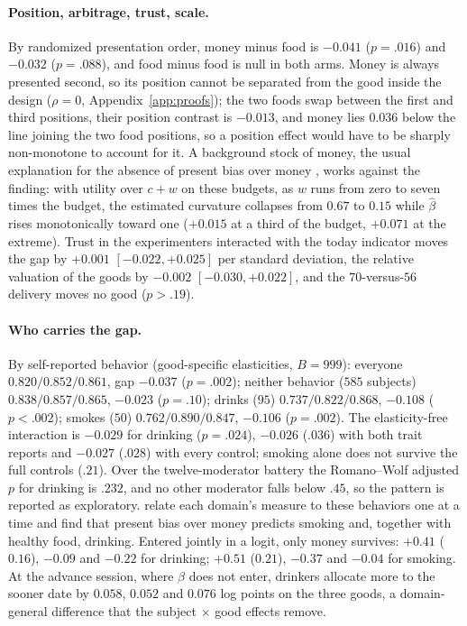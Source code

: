 \documentclass[11pt,a4paper]{article}
\theoremstyle{plain}
\theoremstyle{definition}
\begin{document}
\paragraph{Position, arbitrage, trust, scale.} By randomized presentation order, money minus food is $-0.041$
($p=.016$) and $-0.032$ ($p=.088$), and food minus food is null in both arms. Money is always presented second, so its
position cannot be separated from the good inside the design ($\rho=0$, Appendix~\ref{app:proofs}); the two foods swap
between the first and third positions, their position contrast is $-0.013$, and money lies $0.036$ below the line
joining the two food positions, so a position effect would have to be sharply non-monotone to account for it. A
background stock of money, the usual explanation for the absence of present bias over money \citep{cohen2020}, works
against the finding: with utility over $c+w$ on these budgets, as $w$ runs from zero to seven times the budget, the
estimated curvature collapses from $0.67$ to $0.15$ while $\hat\beta$ rises monotonically toward one ($+0.015$ at a
third of the budget, $+0.071$ at the extreme). Trust in the experimenters interacted with the today indicator moves
the gap by $+0.001$ $[-0.022,+0.025]$ per standard deviation, the relative valuation of the goods by $-0.002$
$[-0.030,+0.022]$, and the $70$-versus-$56$ delivery moves no good ($p>.19$).

\paragraph{Who carries the gap.} By self-reported behavior (good-specific elasticities, $B=999$): everyone
$0.820/0.852/0.861$, gap $-0.037$ ($p=.002$); neither behavior ($585$ subjects) $0.838/0.857/0.865$, $-0.023$
($p=.10$); drinks ($95$) $0.737/0.822/0.868$, $-0.108$ ($p<.002$); smokes ($50$) $0.762/0.890/0.847$, $-0.106$
($p=.002$). The elasticity-free interaction is $-0.029$ for drinking ($p=.024$), $-0.026$ ($.036$) with both trait
reports and $-0.027$ ($.028$) with every control; smoking alone does not survive the full controls ($.21$). Over the
twelve-moderator battery the Romano--Wolf adjusted $p$ for drinking is $.232$, and no other moderator falls below
$.45$, so the pattern is reported as exploratory. \citet{cheung2022} relate each domain's measure to these behaviors
one at a time and find that present bias over money predicts smoking and, together with healthy food, drinking.
Entered jointly in a logit, only money survives: $+0.41$ ($0.16$), $-0.09$ and $-0.22$ for drinking; $+0.51$
($0.21$), $-0.37$ and $-0.04$ for smoking. At the advance session, where $\beta$ does not enter, drinkers allocate
more to the sooner date by $0.058$, $0.052$ and $0.076$ log points on the three goods, a domain-general difference that
the subject $\times$ good effects remove.
\end{document}
